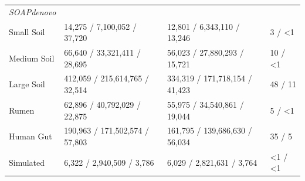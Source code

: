 \documentclass[10pt]{article}
\begin{document}
\begin{table}[h]
\begin{tabular}{l l l l}
\end{tabular}
\medskip
\begin{tabular}{l l l l}
\emph{SOAPdenovo}   \\ 
Small Soil		&14,275 / 7,100,052 / 37,720	&12,801 / 6,343,110 / 13,246		&3 / \textless1\\
Medium Soil	&66,640 / 33,321,411 / 28,695	&56,023 / 27,880,293 / 15,721		&10 / \textless1\\
Large Soil		&412,059 / 215,614,765 / 32,514	&334,319 /  171,718,154 / 41,423	&48 / 11\\
Rumen		&62,896 / 40,792,029 / 22,875		&55,975 / 34,540,861 / 19,044	&5 / \textless 1\\
Human Gut	&190,963 / 171,502,574 / 57,803	&161,795 / 139,686,630 / 56,034	&35 / 5\\
Simulated		&6,322 / 2,940,509 / 3,786		&6,029 / 2,821,631 / 3,764	&\textless1 / \textless1\\
\end{tabular}
\label{assembly-stats}
\end{table}
\end{document}
